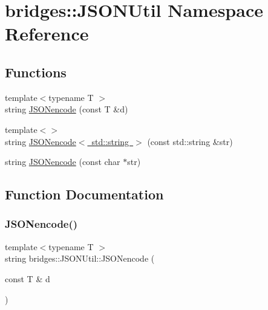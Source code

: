 \hypertarget{namespacebridges_1_1_j_s_o_n_util}{}\section{bridges\+:\+:J\+S\+O\+N\+Util Namespace Reference}
\label{namespacebridges_1_1_j_s_o_n_util}
\subsection*{Functions}
\begin{DoxyCompactItemize}
\item 
{\footnotesize template$<$typename T $>$ }\\string \mbox{\hyperlink{namespacebridges_1_1_j_s_o_n_util_aaf500e70dc1b2a9fd1284e386af1be63}{J\+S\+O\+Nencode}} (const T \&d)
\item 
{\footnotesize template$<$$>$ }\\string \mbox{\hyperlink{namespacebridges_1_1_j_s_o_n_util_a2b258507ccdf822ecebbbbb0b66fb06d}{J\+S\+O\+Nencode$<$ std\+::string $>$}} (const std\+::string \&str)
\item 
string \mbox{\hyperlink{namespacebridges_1_1_j_s_o_n_util_a8167097b34730f71a1b395a76eecd550}{J\+S\+O\+Nencode}} (const char $\ast$str)
\end{DoxyCompactItemize}


\subsection{Function Documentation}
\mbox{\label{namespacebridges_1_1_j_s_o_n_util_aaf500e70dc1b2a9fd1284e386af1be63}} 
\subsubsection{\texorpdfstring{J\+S\+O\+Nencode()}{JSONencode()}\hspace{0.1cm}{\footnotesize\ttfamily [1/2]}}
{\footnotesize\ttfamily template$<$typename T $>$ \\
string bridges\+::\+J\+S\+O\+N\+Util\+::\+J\+S\+O\+Nencode (\begin{DoxyParamCaption}\item[{const T \&}]{d }\end{DoxyParamCaption})\hspace{0.3cm}{\ttfamily [inline]}}

